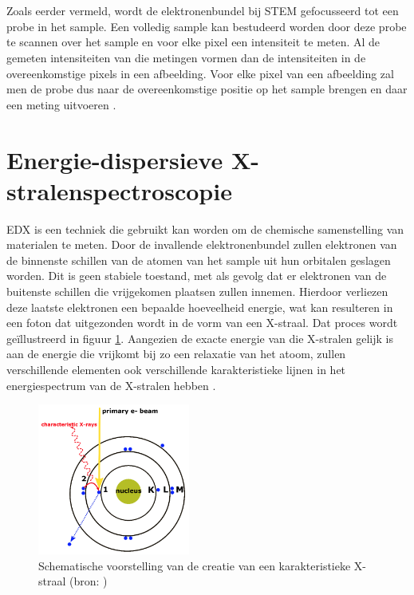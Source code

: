 \documentclass{report}
\begin{document}
\\ \\
Zoals eerder vermeld, wordt de elektronenbundel bij STEM gefocusseerd tot een probe in het sample. Een volledig sample kan bestudeerd worden door deze probe te scannen over het sample en voor elke pixel een intensiteit te meten. Al de gemeten intensiteiten van die metingen vormen dan de intensiteiten in de overeenkomstige pixels in een afbeelding. Voor elke pixel van een afbeelding zal men de probe dus naar de overeenkomstige positie op het sample brengen en daar een meting uitvoeren \cite{book:williamscarter}.

\section{Energie-dispersieve X-stralenspectroscopie} \label{ch:edx}
EDX is een techniek die gebruikt kan worden om de chemische samenstelling van materialen te meten. Door de invallende elektronenbundel zullen elektronen van de binnenste schillen van de atomen van het sample uit hun orbitalen geslagen worden. Dit is geen stabiele toestand, met als gevolg dat er elektronen van de buitenste schillen die vrijgekomen plaatsen zullen innemen. Hierdoor verliezen deze laatste elektronen een bepaalde hoeveelheid energie, wat kan resulteren in een foton dat uitgezonden wordt in de vorm van een X-straal. Dat proces wordt geïllustreerd in figuur \ref{fig:tem_xray_generation}. Aangezien de exacte energie van die X-stralen gelijk is aan de energie die vrijkomt bij zo een relaxatie van het atoom, zullen verschillende elementen ook verschillende karakteristieke lijnen in het energiespectrum van de X-stralen hebben \cite{book:williamscarter}.
\begin{figure}[h!]
	\centering
	\includegraphics[width=5cm]{images/tem/xray_generation.png}
	\caption{Schematische voorstelling van de creatie van een karakteristieke X-straal (bron: \cite{fig:xray})}
	\label{fig:tem_xray_generation}
\end{figure}
\end{document}
